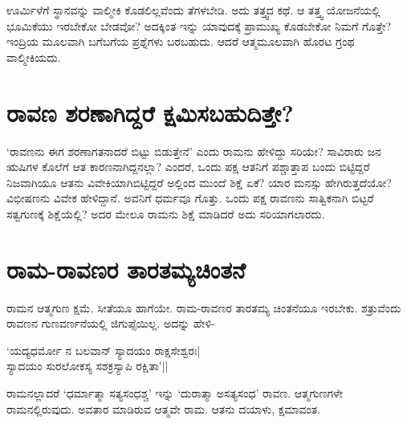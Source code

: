 ಊರ್ಮಿಳೆಗೆ ಸ್ಥಾನವನ್ನು ವಾಲ್ಮೀಕಿ ಕೊಡಲಿಲ್ಲವೆಂದು ತೆಗಳಬೇಡಿ. ಅದು ತತ್ತ್ವದ ಕಥೆ. ಆ ತತ್ತ್ವ ಯೋಜನೆಯಲ್ಲಿ ಭೂಮಿಕೆಯು ಇರಬೇಕೋ ಬೇಡವೋ? ಅದಕ್ಕಿಂತ ಇನ್ನು ಯಾವುದಕ್ಕೆ ಪ್ರಾಮುಖ್ಯ ಕೊಡಬೇಕೋ ನಿಮಗೆ ಗೊತ್ತೇ? ಇಂದ್ರಿಯ ಮೂಲವಾಗಿ ಬಗೆಬಗೆಯ ಪ್ರಶ್ನೆಗಳು ಬರಬಹುದು. ಆದರೆ ಆತ್ಮಮೂಲವಾಗಿ ಹೊರಟ ಗ್ರಂಥ ವಾಲ್ಮೀಕಿಯದು.

\section*{ರಾವಣ ಶರಣಾಗಿದ್ದರೆ ಕ್ಷಮಿಸಬಹುದಿತ್ತೇ?}

`ರಾವಣನು ಈಗ ಶರಣಾಗತನಾದರೆ ಬಿಟ್ಟು ಬಿಡುತ್ತೇನೆ' ಎಂದು ರಾಮನು ಹೇಳಿದ್ದು  ಸರಿಯೇ? ಸಾವಿರಾರು ಜನ ಋಷಿಗಳ ಕೊಲೆಗೆ ಆತ ಕಾರಣನಾಗಿದ್ದನಲ್ಲಾ? ಎಂದರೆ, ಒಂದು ಪಕ್ಷ ಆತನಿಗೆ ಪಶ್ಚಾತ್ತಾಪ ಬಂದು ಬಿಟ್ಟಿದ್ದರೆ ನಿಜವಾಗಿಯೂ ಆತನು ವಿವೇಕಿಯಾಗಿಬಿಟ್ಟಿದ್ದರೆ ಅಲ್ಲಿಂದ ಮುಂದೆ ಶಿಕ್ಷೆ ಏಕೆ? ಯಾರ ಮನಸ್ಸು ಹೇಗಿರುತ್ತದೆಯೋ? ವಿಭೀಷಣನು ವಿವೇಕ ಹೇಳಿದ್ದಾನೆ. ಅವನಿಗೆ ಧರ್ಮವೂ ಗೊತ್ತು. ಒಂದು ಪಕ್ಷ ರಾವಣನು ಸಾತ್ವಿಕನಾಗಿ ಬಿಟ್ಟರೆ ಸತ್ವಗುಣಕ್ಕೆ ಶಿಕ್ಷೆಯೆಲ್ಲಿ? ಅದರ ಮೇಲೂ ರಾಮನು ಶಿಕ್ಷೆ ಮಾಡಿದರೆ ಅದು ಸರಿಯಾಗಲಾರದು.

\section*{ರಾಮ-ರಾವಣರ ತಾರತಮ್ಯಚಿಂತನೆ}

ರಾಮನ ಆತ್ಮಗುಣ ಕ್ಷಮೆ. ಸೀತೆಯೂ ಹಾಗೆಯೇ. ರಾಮ-ರಾವಣರ ತಾರತಮ್ಯ ಚಿಂತನೆಯೂ ಇರಬೇಕು. ಶತ್ರುವೆಂದು ರಾವಣನ ಗುಣವರ್ಣನೆಯಲ್ಲಿ ಜಿಗುಪ್ಸೆಯಿಲ್ಲ. ಅದನ್ನು ಹೇಳಿ-

\begin{shloka}
`ಯದ್ಯಧರ್ಮೋ ನ ಬಲವಾನ್ ಸ್ಯಾದಯಂ ರಾಕ್ಷಸೇಶ್ವರಃ|\\
ಸ್ಯಾದಯಂ ಸುರಲೋಕಸ್ಯ ಸಶಕ್ರಸ್ಯಾಪಿ ರಕ್ಷಿತಾ'||
\end{shloka}

ರಾಮನಲ್ಲಾದರೆ `ಧರ್ಮಾತ್ಮಾ ಸತ್ಯಸಂಧಶ್ಚ' ಇನ್ನು `ದುರಾತ್ಮಾ ಅಸತ್ಯಸಂಧ' ರಾವಣ. ಆತ್ಮಗುಣಗಳೇ ರಾಮನಲ್ಲಿರುವುದು. ಅವತಾರ ಮಾಡಿರುವ ಆತ್ಮವೇ ರಾಮ. ಆತನು ದಯಾಳು, ಕ್ಷಮಾವಂತ.
